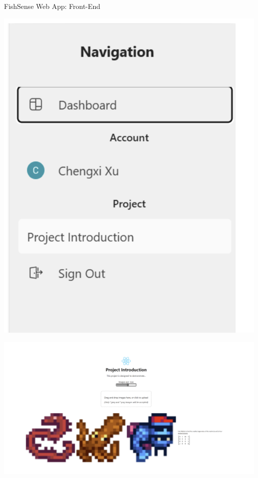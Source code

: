 \begin{frame}{FishSense Web App: Front-End} 
    \centering
    \begin{minipage}{0.2\textwidth}
        \centering
        \includegraphics[height=1.0\textheight,width=1.0\textwidth,keepaspectratio]{images/fishsense_enduser/webapp_navigation.png}
    \end{minipage}
    \hfill
    \begin{minipage}{0.75\textwidth}
        \centering
        \includegraphics[width=\textwidth,keepaspectratio]{images/fishsense_enduser/webapp_gallery.png}
    \end{minipage}
\end{frame}


